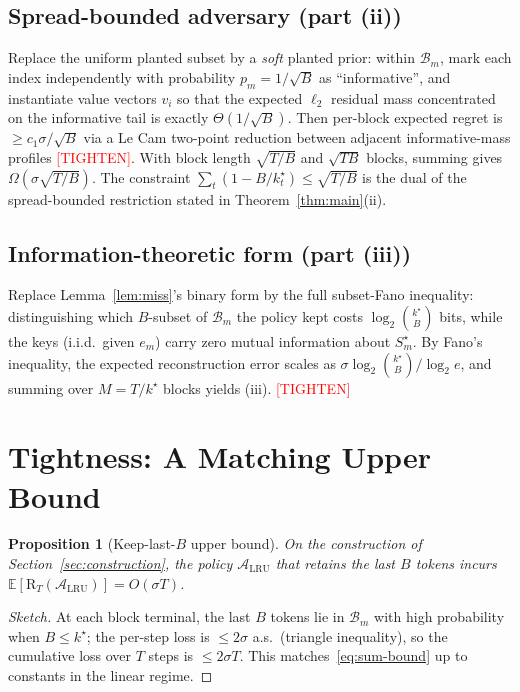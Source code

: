 \documentclass{article}
\newtheorem{proposition}[theorem]{Proposition}
\theoremstyle{definition}
\theoremstyle{remark}
\newcommand{\E}{\mathbb{E}}
\newcommand{\A}{\mathcal{A}}
\newcommand{\Bset}{\mathcal{B}}
\newcommand{\Reg}{\mathrm{R}}
\newcommand{\tighten}{\textcolor{red}{[TIGHTEN]}}
\begin{document}
\subsection{Spread-bounded adversary (part (ii))}

Replace the uniform planted subset by a \emph{soft} planted prior: within $\Bset_m$, mark each index independently with probability $p_m=1/\sqrt B$ as ``informative'', and instantiate value vectors $v_i$ so that the expected $\ell_2$ residual mass concentrated on the informative tail is exactly $\Theta(1/\sqrt B)$. Then per-block expected regret is $\ge c_1\sigma/\sqrt B$ via a Le Cam two-point reduction between adjacent informative-mass profiles \tighten. With block length $\sqrt{T/B}$ and $\sqrt{TB}$ blocks, summing gives $\Omega(\sigma\sqrt{T/B})$. The constraint $\sum_t(1-B/k_t^\star)\le\sqrt{T/B}$ is the dual of the spread-bounded restriction stated in Theorem~\ref{thm:main}(ii).

\subsection{Information-theoretic form (part (iii))}

Replace Lemma~\ref{lem:miss}'s binary form by the full subset-Fano inequality: distinguishing which $B$-subset of $\Bset_m$ the policy kept costs $\log_2\binom{k^\star}{B}$ bits, while the keys (i.i.d.\ given $e_m$) carry zero mutual information about $S_m^\star$. By Fano's inequality, the expected reconstruction error scales as $\sigma\log_2\binom{k^\star}{B}/\log_2 e$, and summing over $M=T/k^\star$ blocks yields (iii). \tighten

\section{Tightness: A Matching Upper Bound}
\label{sec:tight}

\begin{proposition}[Keep-last-$B$ upper bound]\label{prop:upper}
On the construction of Section~\ref{sec:construction}, the policy $\A_{\mathrm{LRU}}$ that retains the last $B$ tokens incurs $\E[\Reg_T(\A_{\mathrm{LRU}})]=O(\sigma T)$.
\end{proposition}
\begin{proof}[Sketch]
At each block terminal, the last $B$ tokens lie in $\Bset_m$ with high probability when $B\le k^\star$; the per-step loss is $\le 2\sigma$ a.s.\ (triangle inequality), so the cumulative loss over $T$ steps is $\le 2\sigma T$. This matches~\eqref{eq:sum-bound} up to constants in the linear regime.
\end{proof}
\end{document}
